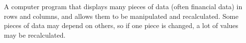 A computer program that displays many pieces of data (often financial data)
in rows and columns, and allows them to be manipulated and recalculated.
Some pieces of data may depend on others, so if one piece is changed, a lot
of values may be recalculated.